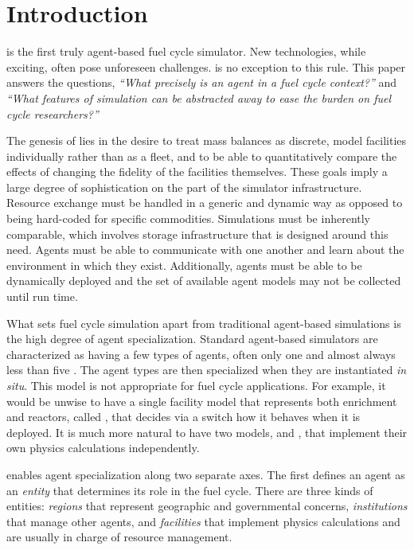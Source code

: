 \section{Introduction}
\label{sec-intro}

\Cyclus \cite{cyclus_v1_0,cyclus_v1_2} is the first truly agent-based 
\cite{jennings2000agent} fuel cycle simulator. 
New technologies, while exciting, often pose unforeseen challenges.
\Cyclus is no exception to this rule.  This paper answers the questions,
\emph{``What precisely is an agent in a fuel cycle context?''} and 
\emph{``What features of simulation can be abstracted away to ease the burden 
on fuel cycle researchers?''}

The genesis of \cyclus lies in the desire to 
treat mass balances as discrete, model facilities individually rather than as 
a fleet, and to be able to quantitatively compare the effects of changing the 
fidelity of the facilities themselves. These goals imply a large degree of 
sophistication on the part of the simulator infrastructure.  Resource exchange
must be handled in a generic and dynamic way as opposed to being hard-coded 
for specific commodities. Simulations must be inherently comparable, which involves 
storage infrastructure that is designed around this need. Agents must be able 
to communicate with one another and learn about the environment in which they 
exist. Additionally, agents must be able to be dynamically deployed and the set of 
available agent models may not be collected until run time. 

What sets fuel cycle simulation apart from traditional agent-based simulations 
is the high degree of agent specialization. Standard agent-based simulators
are characterized as having a few types of agents, often only one and 
almost always less than five \cite{taylor2014agent}. The agent types are then 
specialized 
when they are instantiated \emph{in situ}. This model is not appropriate for 
fuel cycle applications.  For example, it would be unwise to have a single facility model 
that represents both enrichment and reactors, called ,
that decides via a switch how it behaves when it is deployed. It is much 
more natural to have two models,  and , 
that implement their own physics calculations independently.

\Cyclus enables agent specialization along two separate axes. The first defines 
an agent as an \emph{entity} that determines its role in the 
fuel cycle. There are three kinds of entities: \emph{regions} that 
represent geographic and governmental concerns, \emph{institutions} 
that manage other agents, and \emph{facilities} that implement 
physics calculations and are usually in charge of resource management.

